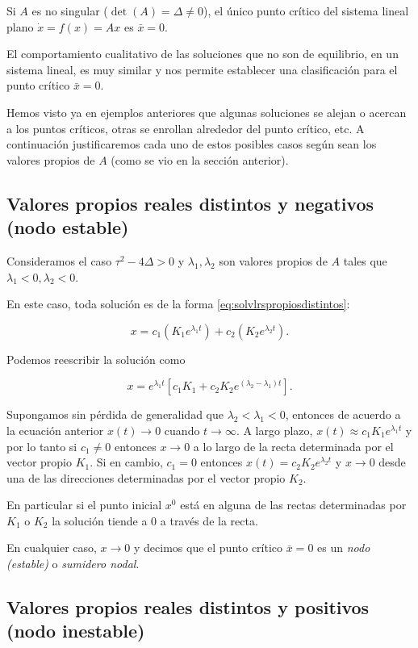 Si $A$ es no singular ($\det(A) = \Delta \neq 0$), el único punto crítico del sistema lineal plano $\dot{x} = f(x) = Ax$ es $\bar{x} = 0$.

El comportamiento cualitativo de las soluciones que no son de equilibrio, en un sistema lineal, es muy similar y nos permite establecer una clasificación para el punto crítico $\bar{x} = 0$.

Hemos visto ya en ejemplos anteriores que algunas soluciones se alejan o acercan a los puntos críticos, otras se enrollan alrededor del punto crítico, etc. A continuación justificaremos cada uno de estos posibles casos según sean los valores propios de $A$ (como se vio en la sección anterior).

\subsection{Valores propios reales distintos y negativos (nodo estable)}
Consideramos el caso $\tau^2 - 4\Delta > 0$ y $\lambda_1, \lambda_2$ son valores propios de $A$ tales que $\lambda_1 < 0, \lambda_2 < 0$.

En este caso, toda solución es de la forma \ref{eq:solvlrspropiosdistintos}:

$$ x = c_1(K_1 e^{\lambda_1 t}) + c_2(K_2 e^{\lambda_2 t}). $$

Podemos reescribir la solución como

$$ x = e^{\lambda_1 t} [ c_1 K_1 + c_2K_2 e^{(\lambda_2 - \lambda_1)t} ].$$

Supongamos sin pérdida de generalidad que $\lambda_2 < \lambda_1 < 0$, entonces de acuerdo a la ecuación anterior $x(t) \to 0$ cuando $t \to \infty$.
A largo plazo, $x(t) \approx c_1K_1e^{\lambda_1 t}$ y por lo tanto si $c_1 \neq 0$ entonces $x \to 0$ a lo largo de la recta determinada por el vector propio $K_1$.
Si en cambio, $c_1 = 0$ entonces $x(t) = c_2 K_2 e^{\lambda_2 t}$ y $x \to 0$ desde una de las direcciones determinadas por el vector propio $K_2$.

En particular si el punto inicial $x^0$ está en alguna de las rectas determinadas por $K_1$ o $K_2$ la solución tiende a 0 a través de la recta.

En cualquier caso, $x \to 0$ y decimos que el punto crítico $\bar{x} = 0$ es un \emph{nodo (estable)} o \emph{sumidero nodal}.

\subsection{Valores propios reales distintos y positivos (nodo inestable)}

